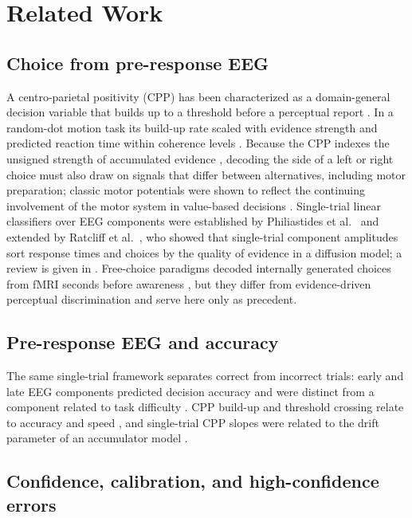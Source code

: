 \documentclass[11pt,a4paper]{article}
\begin{document}
\section{Related Work}

\subsection{Choice from pre-response EEG}

A centro-parietal positivity (CPP) has been characterized as a domain-general decision variable that builds up to a threshold before a perceptual report \cite{r6}. In a random-dot motion task its build-up rate scaled with evidence strength and predicted reaction time within coherence levels \cite{r7}. Because the CPP indexes the unsigned strength of accumulated evidence \cite{r8}, decoding the side of a left or right choice must also draw on signals that differ between alternatives, including motor preparation; classic motor potentials were shown to reflect the continuing involvement of the motor system in value-based decisions \cite{r9}. Single-trial linear classifiers over EEG components were established by Philiastides et al.\ \cite{r10} and extended by Ratcliff et al.\ \cite{r11}, who showed that single-trial component amplitudes sort response times and choices by the quality of evidence in a diffusion model; a review is given in \cite{r12}. Free-choice paradigms decoded internally generated choices from fMRI seconds before awareness \cite{r13,r14}, but they differ from evidence-driven perceptual discrimination and serve here only as precedent.

\subsection{Pre-response EEG and accuracy}

The same single-trial framework separates correct from incorrect trials: early and late EEG components predicted decision accuracy and were distinct from a component related to task difficulty \cite{r10}. CPP build-up and threshold crossing relate to accuracy and speed \cite{r6,r7}, and single-trial CPP slopes were related to the drift parameter of an accumulator model \cite{r15}.

\subsection{Confidence, calibration, and high-confidence errors}
\end{document}
